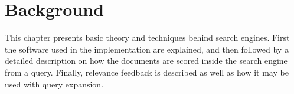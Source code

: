 \chapter{Background}
\label{ch:background}
This chapter presents basic theory and techniques behind search engines. First
the software used in the implementation are explained, and then followed by a
detailed description on how the documents are scored inside the search engine from a
query. Finally, relevance feedback is described as well as how it may be used with query
expansion.










\cleardoublepage
